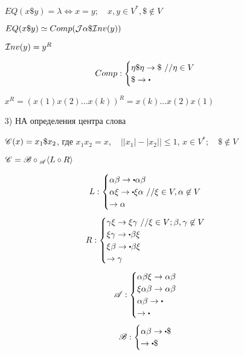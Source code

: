 \begin{itemize}
            $EQ(x\$y) = \lambda \Longleftrightarrow x = y; \quad x,y \in V^{*}, \$ \not\in V$ 

            $EQ(x\$y) \simeq Comp({\cal J}\alpha\${\cal I}nv(y))$ 

            ${\cal I}nv(y) = y^{R}$ 

            \[
            Comp: \begin{cases}
                \eta\$\eta \to \$\text{ //}\eta \in V\\
                \$ \to \bigcdot\\
            \end{cases}
            \]

            $x^{R} = (x(1)x(2)\ldots x(k))^{R} = x(k)\ldots x(2)x(1)$
            

        \item[3)] НА определения центра слова

            $\mathscr{C}(x) = x_1\$x_2$, где $x_1x_2 = x,  \quad \left| |x_1| - |x_2| \right| \le 1$,
            $x \in V^{*}; \quad \$ \not\in V$

            $\mathscr{C} = \mathscr{B} \circ {}_{\mathscr{A}}\langle L \circ R \rangle$ 

            \[
            L: \begin{cases}
                \alpha\beta \to \bigcdot\alpha\beta\\
                \alpha\xi \to \bigcdot \xi\alpha\text{ //}\xi \in V, \alpha \not\in V\\
                \to \alpha\\
            \end{cases}
            \] 
            \[
            R: \begin{cases}
                \gamma\xi \to \xi\gamma\text{ //}\xi \in V; \beta,\gamma \not\in V\\
                \xi\gamma \to \bigcdot\beta\xi\\
                \xi\beta \to \bigcdot\beta\xi\\
                \to \gamma\\
            \end{cases}
            \]
            \[
            \scr{A}: \begin{cases}
                \alpha\beta\xi \to \alpha\beta\\
                \xi\alpha\beta \to \alpha\beta\\
                \alpha\beta \to \bigcdot\\
                \to \bigcdot\\
            \end{cases}
            \] 
            \[
            \scr{B}: \begin{cases}
                \alpha\beta \to \bigcdot\$\\
                \to \bigcdot\$
            \end{cases}
            \]


\end{itemize}
